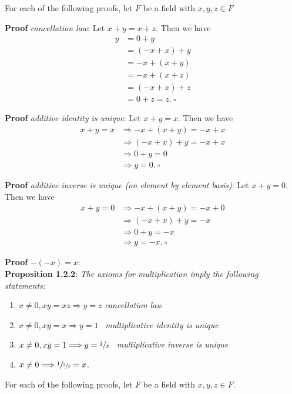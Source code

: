 \documentclass{article}
\begin{document}
For each of the following proofs, let $F$ be a field with $x,y,z \in F$

\textbf{Proof} \textit{cancellation law}: Let $x+y=x+z$. Then we have
\begin{align*}
    y&=0+y\\
    &=(-x+x)+y\\
    &=-x+(x+y)\\
    &=-x+(x+z)\\
    &=(-x+x)+z\\
    &=0+z = z. \ \square 
\end{align*}

\textbf{Proof} \textit{additive identity is unique}: Let $x+y=x$. Then we have
\begin{align*}
    x+y=x &\Longrightarrow -x + (x + y) = -x + x\\
    &\Longrightarrow (-x+x)+y=-x+x\\
    &\Longrightarrow 0+y=0\\
    &\Longrightarrow y=0. \ \square 
\end{align*}

\textbf{Proof} \textit{additive inverse is unique (on element by element basis)}: Let $x+y=0$. Then we have
\begin{align*}
    x+y=0 &\Longrightarrow -x+(x+y)=-x+0\\
    &\Longrightarrow (-x+x)+y=-x\\
    &\Longrightarrow 0+y=-x\\
    &\Longrightarrow y=-x. \ \square
\end{align*}

\textbf{Proof} \textit{$-(-x)=x$}: \\

\textbf{Proposition 1.2.2}: \textit{The axioms for multiplication imply the following statements:}

\begin{enumerate}
    \item $x \neq 0, xy=xz \Longrightarrow y = z$ \textit{cancellation law}
    \item $x \neq 0, xy=x \Longrightarrow y = 1$ \ \textit{multiplicative identity is unique}
    \item $x \neq 0, xy=1 \Longrightarrow y=\sfrac{1}{x}$ \ \textit{multiplicative inverse is unique}
    \item $x \neq 0 \Longrightarrow \sfrac{1}{\sfrac{1}{x}}=x$.
\end{enumerate}

For each of the following proofs, let $F$ be a field with $x, y, z \in F$.\\
\end{document}
